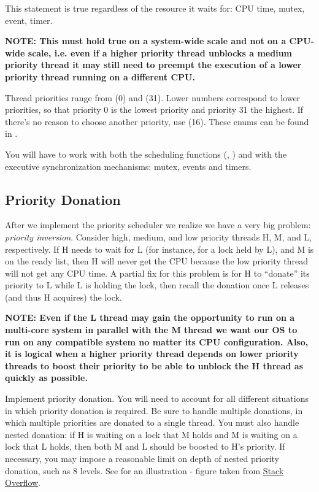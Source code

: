 This statement is true regardless of the resource it waits for: CPU time, mutex, event, timer.

\textbf{NOTE: This must hold true on a system-wide scale and not on a CPU-wide scale, i.e. even if
a higher priority thread unblocks a medium priority thread it may still need to preempt the
execution of a lower priority thread running on a different CPU.}

Thread priorities range from  (0) and  (31).
Lower numbers correspond to lower priorities, so that priority 0 is the lowest priority and priority
31 the highest. If there’s no reason to choose another priority, use  
(16). These enums can be found in .

You will have to work with both the scheduling functions (, 
) and with the executive synchronization mechanisms: mutex, events and
timers.

\subsection{Priority Donation}

After we implement the priority scheduler we realize we have a very big problem: \textit{priority
inversion}. Consider high, medium, and low priority threads H, M, and L, respectively. If H needs to 
wait for L (for instance, for a lock held by L), and M is on the ready list, then H will never get 
the CPU because the low priority thread will not get any CPU time. A partial fix for this problem is
for H to “donate” its priority to L while L is holding the lock, then recall the donation once L
releases (and thus H acquires) the lock.

\textbf{NOTE: Even if the L thread may gain the opportunity to run on a multi-core system in
parallel with the M thread we want our OS to run on any compatible system no matter its CPU
configuration. Also, it is logical when a higher priority thread depends on lower priority threads
to boost their priority to be able to unblock the H thread as quickly as possible.}

Implement priority donation. You will need to account for all different situations in which priority 
donation is required. Be sure to handle multiple donations, in which multiple priorities are donated 
to a single thread. You must also handle nested donation: if H is waiting on a lock that M holds and 
M is waiting on a lock that L holds, then both M and L should be boosted to H’s priority. If 
necessary, you may impose a reasonable limit on depth of nested priority donation, such as 8 levels.
See  for an illustration - figure taken from 
\href{http://stackoverflow.com/questions/4252158/what-is-priority-inversion}{Stack Overflow}.

